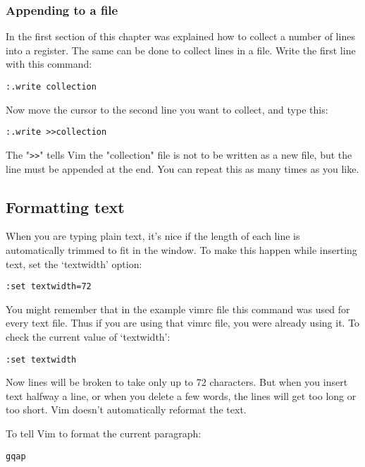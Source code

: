 \subsubsection{Appending to a file}
In the first section of this chapter was explained how to collect a number of lines into a register.
The same can be done to collect lines in a file.
Write the first line with this command:

\begin{Verbatim}[samepage=true]
 :.write collection
\end{Verbatim}

Now move the cursor to the second line you want to collect, and type this:

\begin{Verbatim}[samepage=true]
 :.write >>collection
\end{Verbatim}

The "\verb!>>!" tells Vim the "collection" file is not to be written as a new file, but the line must be appended at the end.
You can repeat this as many times as you like.
\subsection{Formatting text}
When you are typing plain text, it's nice if the length of each line is automatically trimmed to fit in the window.
To make this happen while inserting text, set the `textwidth' option:

\begin{Verbatim}[samepage=true]
 :set textwidth=72
\end{Verbatim}

You might remember that in the example vimrc file this command was used for every text file.
Thus if you are using that vimrc file, you were already using it.
To check the current value of `textwidth':

\begin{Verbatim}[samepage=true]
 :set textwidth
\end{Verbatim}

Now lines will be broken to take only up to 72 characters.
But when you insert text halfway a line, or when you delete a few words, the lines will get too long or too short.
Vim doesn't automatically reformat the text.

To tell Vim to format the current paragraph:

\begin{Verbatim}[samepage=true]
 gqap
\end{Verbatim}

